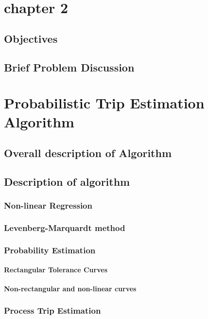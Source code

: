 \documentclass[14pt, a4paper]{extreport}
\begin{document}
         
		
	
	\chapter[Chapter 2]{chapter 2}
		\section{Objectives}
		\section{Brief Problem Discussion}
	
	\chapter[Probabilistic Trip Estimation]{Probabilistic Trip Estimation Algorithm}
		
		\section[Overview]{Overall description of Algorithm}
		
		\section[Detailed Analysis]{Description of algorithm}
			\subsection{Non-linear Regression}
			\subsection{Levenberg-Marquardt method}
			
			\subsection{Probability Estimation}
				\subsubsection{Rectangular Tolerance Curves}
				\subsubsection{Non-rectangular and non-linear curves}
			
			\subsection{Process Trip Estimation}
	
\end{document}
